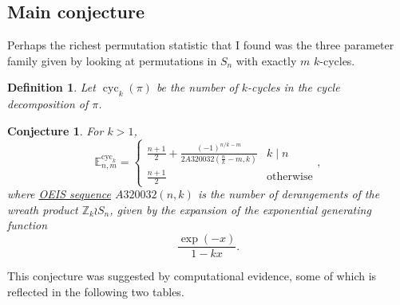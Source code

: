 \documentclass{article}
\numberwithin{equation}{subsection}
\newtheorem{definition}[theo]{Definition}
\newtheorem{conjecture}[theo]{Conjecture}
\begin{document}
\subsection{Main conjecture}
Perhaps the richest permutation statistic that I found was the three parameter
family given by looking at permutations in $S_n$ with exactly $m$ $k$-cycles.

\begin{definition}
  Let $\operatorname{cyc}_k(\pi)$ be the number of $k$-cycles in the cycle decomposition of $\pi$.
\end{definition}

\begin{conjecture}
  \label{mainConjecture}
  For $k > 1$,
  \begin{equation}
    \label{eq:mainConjecture}
    \mathbb{E}_{n,m}^{\text{cyc}_k} = \begin{cases}
      \displaystyle\frac{n+1}{2} + \frac{(-1)^{n/k-m}}{2 A320032(\frac nk - m, k)} & k \mid n \\
      \displaystyle\frac{n+1}{2} & \text{otherwise}
    \end{cases},
  \end{equation} where \href{https://oeis.org/A320032}{OEIS sequence} $A320032(n,k)$ is the number of derangements of the
  wreath product $\mathbb Z_k \wr S_n$, given by the expansion of the
  exponential generating function \begin{equation}
    \frac{\exp(-x)}{1 - kx}.
  \end{equation}
\end{conjecture}

This conjecture was suggested by computational evidence, some of which is
reflected in the following two tables.
\end{document}
